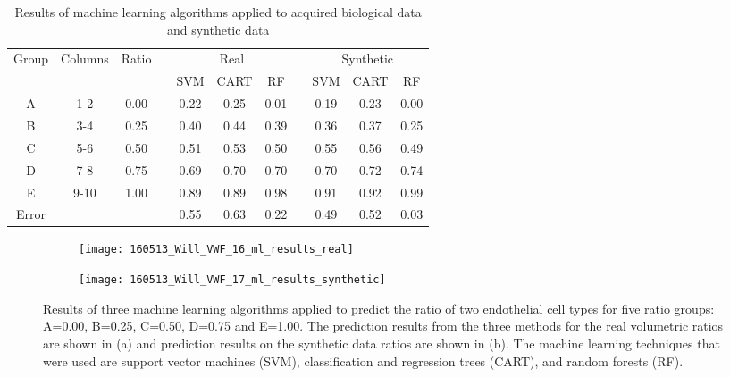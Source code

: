 \begin{table}[htbp!]
\centering
\caption[Mixed ratios cell classification machine learning performance]{Results of machine learning algorithms applied to acquired biological data and synthetic data}
\label{table:endothelial_morphometry:cell_classification_performance}
\begin{tabular}{c c c c c c c c c c c}
\toprule
\multirow{2}{*}{Group} & \multirow{2}{*}{Columns} & \multirow{2}{*}{Ratio} & & \multicolumn{3}{c}{Real} & & \multicolumn{3}{c}{Synthetic}\\
\cmidrule{5-7}
\cmidrule{9-11}
	& & & & SVM & CART & RF & & SVM & CART & RF\\
\midrule
	A & 1-2 & 0.00 & & 0.22 & 0.25 & 0.01 & & 0.19 & 0.23 & 0.00 \\
	B & 3-4 & 0.25 & & 0.40 & 0.44 & 0.39 & & 0.36 & 0.37 & 0.25 \\
	C & 5-6 & 0.50 & & 0.51 & 0.53 & 0.50 & & 0.55 & 0.56 & 0.49 \\
	D & 7-8 & 0.75 & & 0.69 & 0.70 & 0.70 & & 0.70 & 0.72 & 0.74 \\
	E & 9-10 &1.00 & & 0.89 & 0.89 & 0.98 & & 0.91 & 0.92 & 0.99 \\
\midrule
	Error & & & & 0.55 & 0.63 & 0.22 & & 0.49 & 0.52 & 0.03 \\
\bottomrule
\end{tabular}
\end{table}

\begin{figure}[htbp!]
	\centering
	\begin{subfigure}[b]{\linewidth}
		\centering
		\texttt{[image: 160513\_Will\_VWF\_16\_ml\_results\_real]}
		\caption{}
		\label{figure:endothelial_morphometry:cell_classification_performance:real}
		\vspace{1ex}
	\end{subfigure}
	\begin{subfigure}[b]{\linewidth}
		\centering
		\texttt{[image: 160513\_Will\_VWF\_17\_ml\_results\_synthetic]}
		\caption{}
		\label{figure:endothelial_morphometry:cell_classification_performance:synthetic}
		\vspace{1ex}
	\end{subfigure}
\caption[Machine learning results in cell classification study]{Results of three machine learning algorithms applied to predict the ratio of two endothelial cell types for five ratio groups: A=0.00, B=0.25, C=0.50, D=0.75 and E=1.00. The prediction results from the three methods for the real volumetric ratios are shown in (a) and prediction results on the synthetic data ratios are shown in (b). The machine learning techniques that were used are support vector machines (SVM), classification and regression trees (CART), and random forests (RF).}
\label{figure:endothelial_morphometry:cell_classification_performance}
\end{figure}

